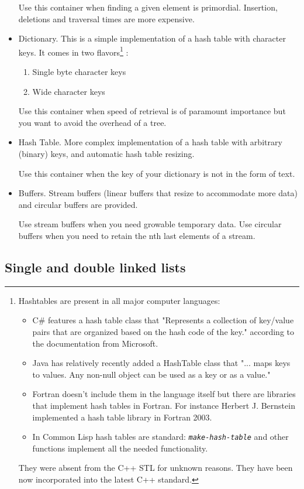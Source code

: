 \documentclass[12pt,a4paper]{memoir} %
\newcommand{\param}[1]{
\texttt{\textsl{#1}}
}
\begin{document}
\begin{itemize}
Use this container when finding a given element is primordial. Insertion, deletions and traversal times are more expensive.
\item
Dictionary. This is a simple implementation of a hash table with character keys. It comes in two flavors\footnote{
Hashtables are present in all major computer languages:
\begin{itemize}
\item C\# features a hash table class that "Represents a collection of key/value pairs that are organized based on the hash code of the key." 
according to the documentation from Microsoft.
\item Java has relatively recently added a HashTable class that "... maps keys to values. Any non-null object can be used as a key or as a value."
\item Fortran doesn't include them in the language itself but there are libraries that implement hash tables in Fortran. For instance 
Herbert J. Bernstein implemented a hash table library in Fortran 2003.
\item In Common Lisp hash tables are standard: \param{make-hash-table} and other functions implement all the needed functionality.
\end{itemize}
They were absent from the C++ STL for unknown reasons. They have been now incorporated into the latest C++ standard.
}
: 
\begin{enumerate}
\item Single byte character keys
\item Wide character keys
\end{enumerate}

Use this container when speed of retrieval is of paramount importance but you want to avoid the overhead of a tree.
\item
Hash Table. More complex implementation of a hash table with arbitrary (binary) keys, and automatic hash table resizing.

Use this container when the key of your dictionary is not in the form of text.
\item Buffers. Stream buffers (linear buffers that resize to accommodate more data) and circular buffers are provided.

Use stream buffers when you need growable temporary data. Use circular buffers when you need to retain the nth last elements of a stream.
\end{itemize}
\subsection{ Single and double linked lists}
\end{document}
